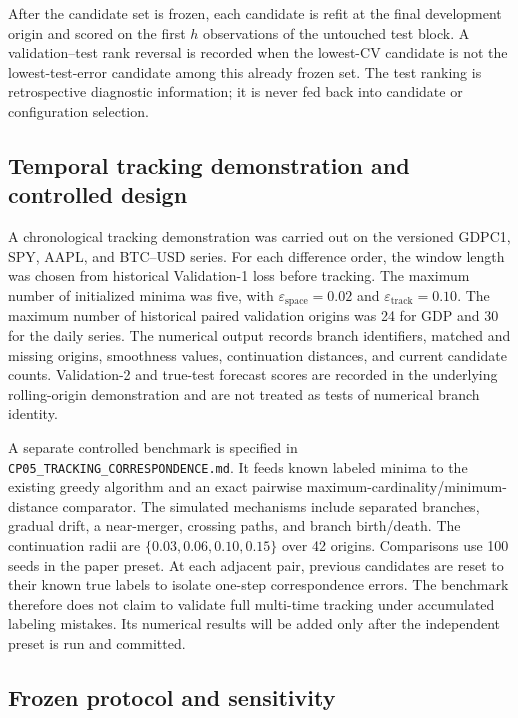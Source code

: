 \documentclass[english]{smcca}
\begin{document}
After the candidate set is frozen, each candidate is refit at the final
development origin and scored on the first \(h\) observations of the untouched
test block. A validation--test rank reversal is recorded when the lowest-CV
candidate is not the lowest-test-error candidate among this already frozen set.
The test ranking is retrospective diagnostic information; it is never fed back
into candidate or configuration selection.

\subsection{Temporal tracking demonstration and controlled design}
\label{sec:tracking_design}

A chronological tracking demonstration was carried out on the versioned
GDPC1, SPY, AAPL, and BTC--USD series. For each difference order, the
window length was chosen from historical Validation-1 loss before tracking.
The maximum number of initialized minima was five, with
$\varepsilon_{\mathrm{space}}=0.02$ and
$\varepsilon_{\mathrm{track}}=0.10$. The maximum number of historical
paired validation origins was 24 for GDP and 30 for the daily series.
The numerical output records branch identifiers, matched and missing
origins, smoothness values, continuation distances, and current
candidate counts. Validation-2 and true-test forecast scores are
recorded in the underlying rolling-origin demonstration and are
not treated as tests of numerical branch identity.

A separate controlled benchmark is specified in
\texttt{CP05\_TRACKING\_CORRESPONDENCE.md}. It feeds known labeled
minima to the existing greedy algorithm and an exact pairwise
maximum-cardinality/minimum-distance comparator. The simulated
mechanisms include separated branches, gradual drift, a near-merger,
crossing paths, and branch birth/death. The continuation radii are
$\{0.03,0.06,0.10,0.15\}$ over 42 origins. Comparisons use 100 seeds in
the paper preset. At each adjacent pair, previous candidates are reset
to their known true labels to isolate one-step correspondence errors.
The benchmark therefore does not claim to validate full multi-time
tracking under accumulated labeling mistakes. Its numerical results
will be added only after the independent preset is run and committed.

\subsection{Frozen protocol and sensitivity}
\end{document}
